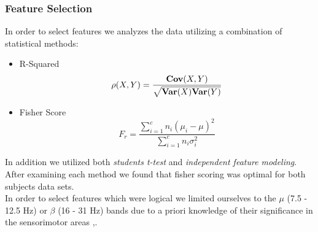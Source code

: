 \documentclass{beamer}
\begin{document}

\begin{frame}
\frametitle{Feature Selection}
In order to select features we analyzes the data utilizing a combination of statistical methods: 
\begin{itemize}
	\item R-Squared \begin{equation}
	\rho(X,Y) = \frac{{\bf
			Cov}(X,Y)}{\sqrt{{\bf Var}(X){\bf Var}(Y)}}
	\label{eq:e3}
	\end{equation}
	\item Fisher Score \begin{equation}
	F_r = \frac{\sum_{i=1}^c n_i(\mu_i - \mu)^2}{\sum_{i=1}^c n_i \sigma_i^2}
	\label{eq:e4}
	\end{equation}
\end{itemize}
In addition we utilized both \emph{students t-test} and \emph{independent feature modeling}. After examining each method we found that fisher scoring \cite{p3} was optimal for both subjects data sets. \\

In order to select features which were logical we limited ourselves to the $\mu$ (7.5 - 12.5 Hz) or $\beta$ (16 - 31 Hz) bands due to a priori knowledge of their significance in the sensorimotor areas \cite{p1},\cite{p2}. \
\end{frame}
\end{document}
